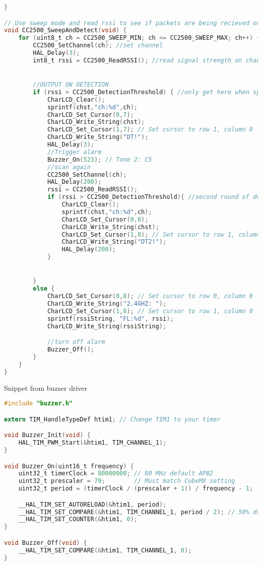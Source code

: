 \documentclass[12pt]{article}
\begin{document}
\begin{lstlisting}[language=C]
}

// Use sweep mode and read rssi to see if packets are being recieved on any channels, read strength, alert on noise floor threshold
void CC2500_SweepAndDetect(void) {
	for (uint8_t ch = CC2500_SWEEP_MIN; ch <= CC2500_SWEEP_MAX; ch++) {
        CC2500_SetChannel(ch); //set channel
        HAL_Delay(3);
        int8_t rssi = CC2500_ReadRSSI(); //read signal strength on channel


        //OUTPUT ON DETECTION
        if (rssi > CC2500_DetectionThreshold) { //only get here when spike is detected
        	CharLCD_Clear();
        	sprintf(chst,"ch:%d",ch);
        	CharLCD_Set_Cursor(0,7);
        	CharLCD_Write_String(chst);
        	CharLCD_Set_Cursor(1,7); // Set cursor to row 1, column 0
        	CharLCD_Write_String("DT!");
        	HAL_Delay(3);
        	//Trigger alarm
        	Buzzer_On(523); // Tone 2: C5
        	//scan again
        	CC2500_SetChannel(ch);
        	HAL_Delay(200);
        	rssi = CC2500_ReadRSSI();
        	if (rssi > CC2500_DetectionThreshold){ //second round of detection if spike is detected
        		CharLCD_Clear();
        		sprintf(chst,"ch:%d",ch);
            	CharLCD_Set_Cursor(0,8);
            	CharLCD_Write_String(chst);
            	CharLCD_Set_Cursor(1,8); // Set cursor to row 1, column 0
            	CharLCD_Write_String("DT2!");
            	HAL_Delay(200);
        	}


        }
        else {
        	CharLCD_Set_Cursor(0,8); // Set cursor to row 0, column 0
        	CharLCD_Write_String("2.4GHZ: ");
        	CharLCD_Set_Cursor(1,8); // Set cursor to row 1, column 0
        	sprintf(rssiString, "FL:%d", rssi);
        	CharLCD_Write_String(rssiString);

        	//turn off alarm
        	Buzzer_Off();
        }
    }
}

\end{lstlisting}

\vspace{1em}
\text Snippet from buzzer driver
\begin{lstlisting}[language=C]
#include "buzzer.h"

extern TIM_HandleTypeDef htim1; // Change TIM1 to your timer

void Buzzer_Init(void) {
    HAL_TIM_PWM_Start(&htim1, TIM_CHANNEL_1);
}

void Buzzer_On(uint16_t frequency) {
    uint32_t timerClock = 80000000; // 80 MHz default APB2
    uint32_t prescaler = 79;        // Must match CubeMX setting
    uint32_t period = (timerClock / (prescaler + 1)) / frequency - 1;

    __HAL_TIM_SET_AUTORELOAD(&htim1, period);
    __HAL_TIM_SET_COMPARE(&htim1, TIM_CHANNEL_1, period / 2); // 50% duty
    __HAL_TIM_SET_COUNTER(&htim1, 0);
}

void Buzzer_Off(void) {
    __HAL_TIM_SET_COMPARE(&htim1, TIM_CHANNEL_1, 0);
}
\end{lstlisting}
\end{document}
